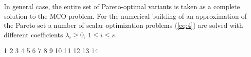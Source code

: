 \documentclass[runningheads]{llncs}
\begin{document}
In general case, the entire set of Pareto-optimal variants is taken as a complete solution to the MCO problem. For the numerical building of an approximation of the Pareto set a number of scalar optimization problems (\ref{eq:4}) are solved with different coefficients $\lambda_i \geq 0$, $1 \leq i \leq s$.



1 \cite{Miettinen1999}
2 \cite{Ehrgott2005}
3 \cite{Pardalos2017}
4 \cite{Strongin2000}
5 \cite{Sergeyev2013}
6 \cite{GergelKozinovAPI2016}
7 \cite{Gergel2018}
8 \cite{Marler2004}
9 \cite{GergelKozinov2020}
10 \cite{Yu2011}
11 \cite{globalizerSystem}
12 \cite{Evtushenko2014}
13 \cite{Zilinskas2015}
14 \cite{PISA2003}

%
%
%
% 
% 
%


\end{document}
